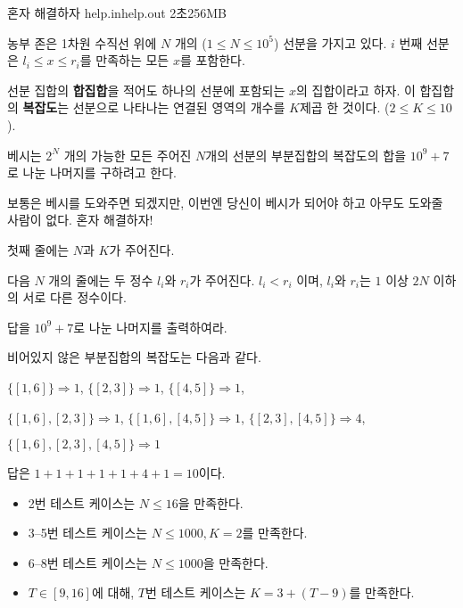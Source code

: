 \begin{problem}{혼자 해결하자} %
	{help.in}{help.out}
	{2초}{256MB}{}
	
	농부 존은 1차원 수직선 위에 $N$ 개의 ($1 \le N \le 10^5$) 선분을 가지고 있다. $i$ 번째 선분은 $l_i \le x \le r_i$를 만족하는 모든 $x$를 포함한다.
	
	선분 집합의 \textbf{합집합}을 적어도 하나의 선분에 포함되는 $x$의 집합이라고 하자. 이 합집합의 \textbf{복잡도}는 선분으로 나타나는 연결된 영역의 개수를 $K$제곱 한 것이다. ($2 \le K \le 10$).
	
	베시는 $2^N$ 개의 가능한 모든 주어진 $N$개의 선분의 부분집합의 복잡도의 합을 $10^9+7$로 나눈 나머지를 구하려고 한다. 
	
	보통은 베시를 도와주면 되겠지만, 이번엔 당신이 베시가 되어야 하고 아무도 도와줄 사람이 없다. 혼자 해결하자!
	
	\InputFile
	
	첫째 줄에는 $N$과 $K$가 주어진다.
	
	다음 $N$ 개의 줄에는 두 정수 $l_i$와 $r_i$가 주어진다. $l_i < r_i$ 이며, $l_i$와 $r_i$는 $1$ 이상 $2N$ 이하의 서로 다른 정수이다.
	
	\OutputFile
	
	답을 $10^9+7$로 나눈 나머지를 출력하여라.
	
	\Example
		
	\begin{example}
	\end{example}
	
	비어있지 않은 부분집합의 복잡도는 다음과 같다.
	
	\begin{center}
		$\{[1, 6]\} \Rightarrow 1$, $\{[2, 3]\} \Rightarrow 1$, $\{[4, 5]\} \Rightarrow 1$,
		
		$\{[1, 6], [2, 3]\} \Rightarrow 1$, $\{[1, 6], [4, 5]\} \Rightarrow 1$, $\{[2, 3], [4, 5]\} \Rightarrow 4$,
		
		$\{[1, 6], [2, 3], [4, 5]\} \Rightarrow 1$
	\end{center}
	
	답은 $1+1+1+1+1+4+1 = 10$이다.
	
	\Scoring
	
	\begin{itemize}
		\item 2번 테스트 케이스는 $N \le 16$을 만족한다.
		\item 3--5번 테스트 케이스는 $N \le 1000, K=2$를 만족한다.
		\item 6--8번 테스트 케이스는 $N \le 1000$을 만족한다.
		\item $T \in [9, 16]$에 대해, $T$번 테스트 케이스는 $K=3+(T-9)$를 만족한다.
	\end{itemize}
	
	
	
	
\end{problem}

